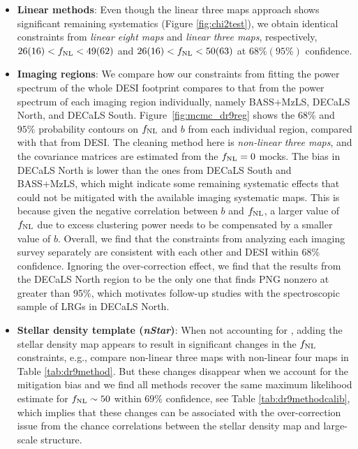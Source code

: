 \begin{itemize}[itemindent=*]

\item \textbf{Linear methods}: Even though the linear three maps approach shows significant remaining systematics (Figure \ref{fig:chi2test}),  we obtain identical constraints from \textit{linear eight maps} and \textit{linear three maps}, respectively, $26(16)<f_{\rm NL}<49(62)$ and $26(16)<f_{\rm NL}<50(63)$ at $68\%(95\%)$ confidence. 

\item \textbf{Imaging regions}: We compare how our constraints from fitting the power spectrum of the whole DESI footprint compares to that from the power spectrum of each imaging region individually, namely BASS+MzLS, DECaLS North, and DECaLS South. Figure~\ref{fig:mcmc_dr9reg} shows the $68\%$ and $95\%$ probability contours on $f_{\rm NL}$ and $b$ from each individual region, compared with that from DESI. The cleaning method here is \textit{non-linear three maps}, and the covariance matrices are estimated from the $f_{\rm NL}=0$ mocks. The bias in DECaLS North is lower than the ones from DECaLS South and BASS+MzLS, which might indicate some remaining systematic effects that could not be mitigated with the available imaging systematic maps. This is because given the negative correlation between $b$ and $f_{\rm NL}$, a larger value of $f_{\rm NL}$ due to excess clustering power needs to be compensated by a smaller value of $b$. Overall, we find that the constraints from analyzing each imaging survey separately are consistent with each other and DESI within $68\%$ confidence. Ignoring the over-correction effect, we find that the results from the DECaLS North region to be the only one that finds PNG nonzero at greater than 95\%, which motivates follow-up studies with the spectroscopic sample of LRGs in DECaLS North.

\item \textbf{Stellar density template (\textit{nStar})}: When not accounting for , adding the stellar density map appears to result in significant changes in the $f_{\rm NL}$ constraints, e.g., compare non-linear three maps with non-linear four maps in Table \ref{tab:dr9method}. But these changes disappear when we account for the mitigation bias and we find all methods recover the same maximum likelihood estimate for $f_{\rm NL} \sim 50$ within $69\%$ confidence, see Table \ref{tab:dr9methodcalib}, which implies that these changes can be associated with the over-correction issue from the chance correlations between the stellar density map and large-scale structure.


\end{itemize}
